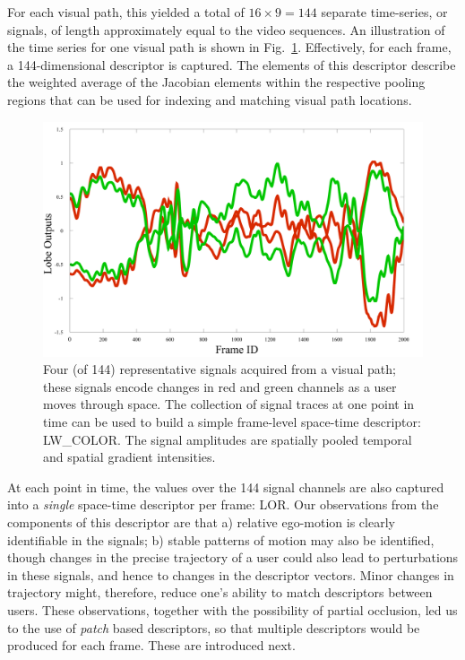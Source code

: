 For each visual path, this yielded a total of $16\times 9 = 144$ separate time-series, or signals, of length approximately equal to the video sequences.  An illustration of the time series for one visual path is shown in Fig.~\ref{fig:Traces}. Effectively, for each frame, a 144-dimensional descriptor is captured. The elements of this descriptor describe the weighted average of the Jacobian elements within the respective pooling regions that can be used for indexing and matching visual path locations.

\begin{figure}
\begin{center}
\includegraphics[width=\linewidth]{./gfx/Chapter04/Lobe1and6_red_green.pdf}
\caption{Four (of 144) representative signals acquired from a visual path; these signals encode changes in red and green channels as a user moves through space.  The collection of signal traces at one point in time can be used to build a simple frame-level space-time descriptor: LW\_COLOR. The signal amplitudes are spatially pooled temporal and spatial gradient intensities.}
\label{fig:Traces}
\end{center}
\end{figure}

At each point in time, the values over the 144 signal channels are also captured into a {\it single} space-time descriptor per frame: 
LOR.  Our observations from the components of this descriptor are that a) relative ego-motion is clearly identifiable in the signals; b) stable patterns of motion may also be identified, though changes in the precise trajectory of a user could also lead to perturbations in these signals, and hence to changes in the descriptor vectors. Minor changes in trajectory might, therefore, reduce one's ability to match descriptors between users.  These observations, together with the possibility of partial occlusion, led us to the use of {\em patch} based descriptors, so that multiple descriptors would be produced for each frame. These are introduced next.


